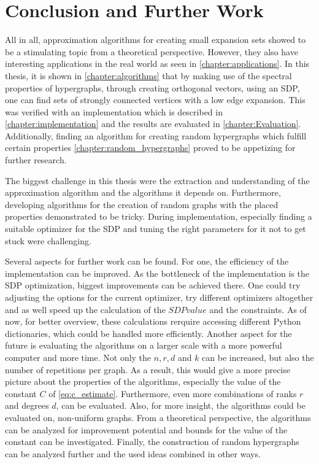 \chapter{Conclusion and Further Work}\label{chapter:resmue_further_work}

All in all, approximation algorithms for creating small expansion sets showed to be a stimulating topic from a theoretical perspective. However, they also have interesting applications in the real world as seen in \cref{chapter:applications}. In this thesis, it is shown in \cref{chapter:algorithms} that by making use of the spectral properties of hypergraphs, through creating orthogonal vectors, using an SDP, one can find sets of strongly connected vertices with a low edge expansion. This was verified with an implementation which is described in \cref{chapter:implementation} and the results are evaluated in \cref{chapter:Evaluation}.
Additionally, finding an algorithm for creating random hypergraphs which fulfill certain properties \cref{chapter:random_hypergraphs} proved to be appetizing for further research.

The biggest challenge in this thesis were the extraction and understanding of the approximation algorithm and the algorithms it depends on. Furthermore, developing algorithms for the creation of random graphs with the placed properties demonstrated to be tricky. During implementation, especially finding a suitable optimizer for the SDP and tuning the right parameters for it not to get stuck were challenging.

Several aspects for further work can be found. 
For one, the efficiency of the implementation can be improved. As the bottleneck of the implementation is the SDP optimization, biggest improvements can be achieved there. One could try adjusting the options for the current optimizer, try different optimizers altogether and as well speed up the calculation of the $SDPvalue$ and the constraints. As of now, for better overview, these calculations rerquire accessing different Python dictionaries, which could be handled more efficiently.
Another aspect for the future is evaluating the algorithms on a larger scale with a more powerful computer and more time. Not only the $n, r, d$ and $k$ can be increased, but also the number of repetitions per graph. As a result, this would give a more precise picture about the properties of the algorithms, especially the value of the constant $C$ of \cref{eq:c_estimate}. Furthermore, even more combinations of ranks $r$ and degrees $d$, can be evaluated. Also, for more insight, the algorithms could be evaluated on, non-uniform graphs. 
From a theoretical perspective, the algorithms can be analyzed for improvement potential and bounds for the value of the constant can be investigated. Finally, the construction of random hypergraphs can be analyzed further and the used ideas combined in other ways.

